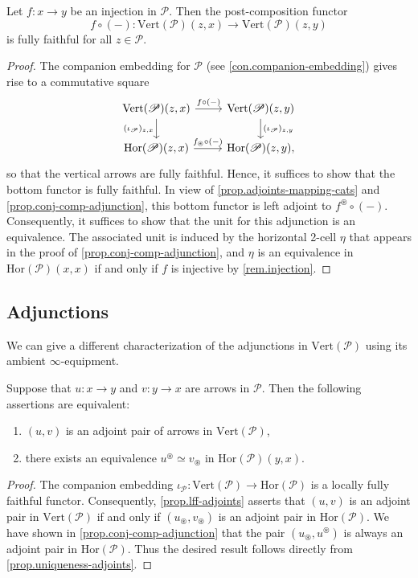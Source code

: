 \documentclass[a4paper, 11pt]{amsart}
\numberwithin{theorem}{section}
\theoremstyle{definition}
\renewcommand{\P}{\mathscr{P}}
\renewcommand{\Vert}{\mathrm{Vert}}
\newcommand{\Hor}{\mathrm{Hor}}
\begin{document}
\begin{proposition}\label{prop.corep-ff}
	Let $f : x \rightarrow y$ be an injection in $\P$. Then the post-composition functor
	$$
	f \circ (-) : \Vert(\P)(z,x) \rightarrow \Vert(\P)(z,y)
	$$
	is fully faithful for all $z \in \P$.
\end{proposition}
\begin{proof}
The companion embedding for $\P$ (see \cref{con.companion-embedding}) gives rise to a commutative square
\[
	\begin{tikzcd}
		\Vert(\P)(z,x) \arrow[r, "f \circ (-)"]\arrow[d, "(\iota_\P)_{z, x}"'] & \Vert(\P)(z,y)\arrow[d, "(\iota_\P)_{z,y}"] \\
		\Hor(\P)(z,x) \arrow[r, "f_\circledast \circ (-)"] & \Hor(\P)(z,y),
	\end{tikzcd}
\]
so that the vertical arrows are fully faithful. Hence, it suffices to show that the bottom functor is fully faithful.
In view of \cref{prop.adjoints-mapping-cats} and \cref{prop.conj-comp-adjunction}, this bottom functor is left adjoint to 
$f^\circledast \circ (-)$. Consequently, it suffices to show that the unit for this adjunction is an equivalence. 
The associated unit is induced by the horizontal 2-cell $\eta$ that appears in the proof of \cref{prop.conj-comp-adjunction}, 
and $\eta$ is an equivalence in $\Hor(\P)(x,x)$ if and only if $f$ is injective by \cref{rem.injection}.
\end{proof}

\subsection{Adjunctions} \label{ssection.fct-adjunctions} We can give a different characterization of the adjunctions in $\Vert(\P)$ 
using its ambient $\infty$-equipment. 

\begin{proposition}\label{prop.comp-conj-char-adjunction}
	Suppose 
	that  $u : x \rightarrow y$ and $v : y \rightarrow x$ are arrows in $\P$. Then the following assertions are equivalent:
	\begin{enumerate}
		\item $(u,v)$ is an adjoint pair of arrows in $\Vert(\P)$,
		\item there exists an equivalence $u^\circledast \simeq v_\circledast$ in $\Hor(\P)(y,x)$.
	\end{enumerate}
\end{proposition}
\begin{proof}
	The companion embedding $\iota_\P : \Vert(\P) \rightarrow \Hor(\P)$ is a locally fully faithful functor. 
	Consequently, \cref{prop.lff-adjoints} asserts that  $(u,v)$ is an adjoint pair 
	in $\Vert(\P)$ if and only if $(u_\circledast, v_\circledast)$ is an adjoint pair in $\Hor(\P)$. We have shown in \cref{prop.conj-comp-adjunction} that
	the pair  $(u_\circledast, u^\circledast )$ is always 
	an adjoint pair in $\Hor(\P)$. Thus the desired result follows directly from \cref{prop.uniqueness-adjoints}.
\end{proof}
\end{document}
